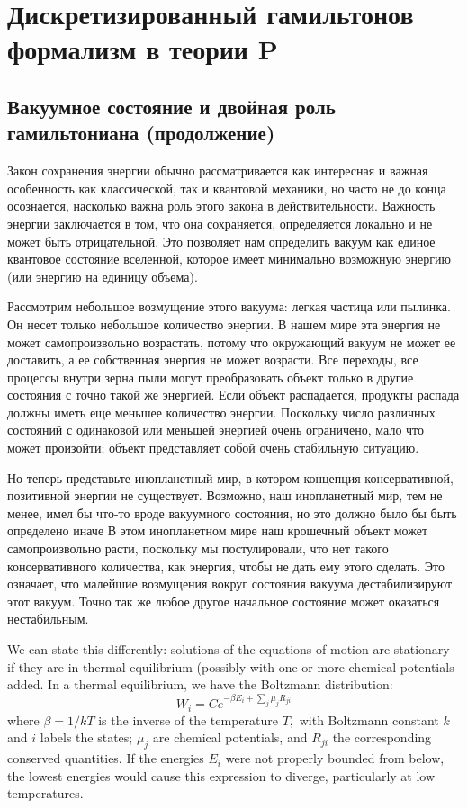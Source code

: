 \documentclass[main.tex]{subfiles}
\begin{document}
\section{Дискретизированный гамильтонов формализм в теории P}\label{ch19}
\subsection{Вакуумное состояние и двойная роль гамильтониана (продолжение) }\label{ch19.1}

Закон сохранения энергии обычно рассматривается как интересная и важная особенность как классической, так и квантовой механики, но часто не до конца осознается, насколько важна роль этого закона в действительности. Важность энергии заключается в том, что она сохраняется, определяется локально и не может быть отрицательной. Это позволяет нам определить вакуум как единое квантовое состояние вселенной, которое имеет минимально возможную энергию (или энергию на единицу объема).

Рассмотрим небольшое возмущение этого вакуума: легкая частица или пылинка. Он несет только небольшое количество энергии. В нашем мире эта энергия не может самопроизвольно возрастать, потому что окружающий вакуум не может ее доставить, а ее собственная энергия не может возрасти. Все переходы, все процессы внутри зерна пыли могут преобразовать объект только в другие состояния с точно такой же энергией. Если объект распадается, продукты распада должны иметь еще меньшее количество энергии. Поскольку число различных состояний с одинаковой или меньшей энергией очень ограничено, мало что может произойти; объект представляет собой очень стабильную ситуацию.

Но теперь представьте инопланетный мир, в котором концепция консервативной, позитивной энергии не существует. Возможно, наш инопланетный мир, тем не менее, имел бы что-то вроде вакуумного состояния, но это должно было бы быть определено иначе В этом инопланетном мире наш крошечный объект может самопроизвольно расти, поскольку мы постулировали, что нет такого консервативного количества, как энергия, чтобы не дать ему этого сделать. Это означает, что малейшие возмущения вокруг состояния вакуума дестабилизируют этот вакуум. Точно так же любое другое начальное состояние может оказаться нестабильным. 

We can state this differently: solutions of the equations of motion are stationary if they are in thermal equilibrium (possibly with one or more chemical potentials added. In a thermal equilibrium, we have the Boltzmann distribution:
$$
W_{i}=C e^{-\beta E_{i}+\sum_{j} \mu_{j} R_{j i}}
$$
where $\beta=1 / k T$ is the inverse of the temperature $T,$ with Boltzmann constant $k$ and $i$ labels the states; $\mu_{j}$ are chemical potentials, and $R_{j i}$ the corresponding conserved quantities.
If the energies $E_{i}$ were not properly bounded from below, the lowest energies would cause this expression to diverge, particularly at low temperatures.
\end{document}
